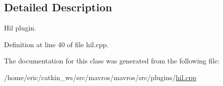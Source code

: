 \subsection{Detailed Description}
Hil plugin. 

Definition at line 40 of file hil.\+cpp.



The documentation for this class was generated from the following file\+:\begin{DoxyCompactItemize}
\item 
/home/eric/catkin\+\_\+ws/src/mavros/mavros/src/plugins/\mbox{\hyperlink{hil_8cpp}{hil.\+cpp}}\end{DoxyCompactItemize}
